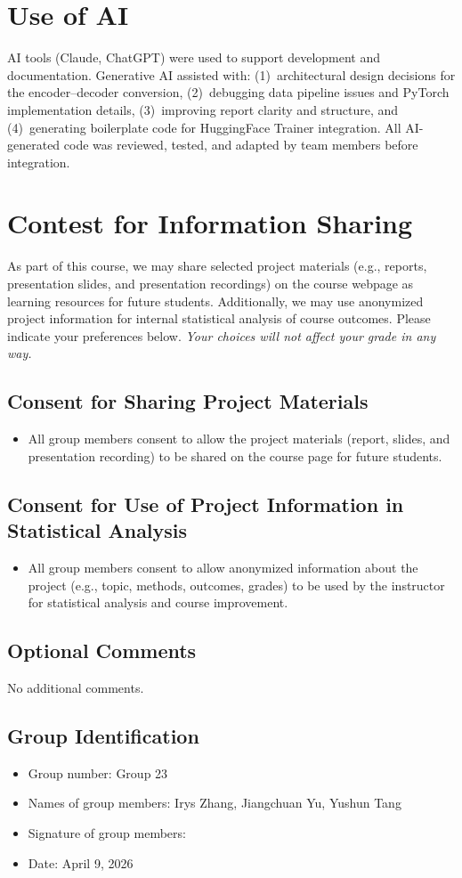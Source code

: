 \documentclass{article}
\begin{document}
\newpage
\section*{Use of AI}
AI tools (Claude, ChatGPT) were used to support development and documentation.
Generative AI assisted with: (1)~architectural design decisions for the encoder--decoder conversion, (2)~debugging data pipeline issues and PyTorch implementation details, (3)~improving report clarity and structure, and (4)~generating boilerplate code for HuggingFace Trainer integration.
All AI-generated code was reviewed, tested, and adapted by team members before integration.

\section*{Contest for Information Sharing}
As part of this course, we may share selected project materials (e.g., reports, presentation slides, and presentation recordings) on the course webpage as learning resources for future students. Additionally, we may use anonymized project information for internal statistical analysis of course outcomes. Please indicate your preferences below. \textit{Your choices will not affect your grade in any way.}

\subsection*{Consent for Sharing Project Materials}
\begin{itemize}
	\item All group members consent to allow the project materials (report, slides, and presentation recording) to be shared on the course page for future students.
\end{itemize}

\subsection*{Consent for Use of Project Information in Statistical Analysis}
\begin{itemize}
	\item All group members consent to allow anonymized information about the project (e.g., topic, methods, outcomes, grades) to be used by the instructor for statistical analysis and course improvement.
\end{itemize}

\subsection*{Optional Comments}
No additional comments.

\subsection*{Group Identification}

\begin{itemize}
	\item Group number: Group 23
	\item Names of group members: Irys Zhang, Jiangchuan Yu, Yushun Tang
	\item Signature of group members:
	\item Date: April 9, 2026
\end{itemize}
\end{document}
